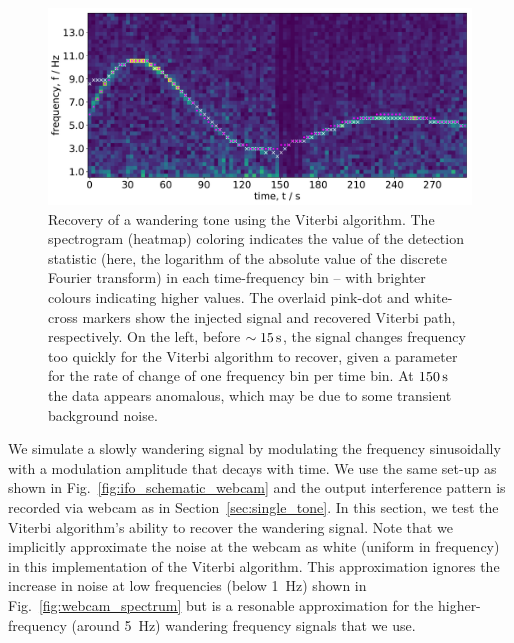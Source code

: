 \documentclass[paper-main.tex]{subfiles}
\begin{document}
\begin{figure}
	\includegraphics[width=\textwidth]{figures/expt_overlay_2_viterbi_test_webcam.pdf}
	\caption{\label{fig:viterbi_overlay}
Recovery of a wandering tone using the Viterbi algorithm.
The spectrogram (heatmap) coloring indicates the value of the detection statistic (here, the logarithm of the absolute value of the discrete Fourier transform) in each time-frequency bin -- with brighter colours indicating higher values. 
The overlaid pink-dot and white-cross markers show the injected signal and recovered Viterbi path, respectively. 
On the left, before $\sim 15\,{\rm s}$, the signal changes frequency too quickly for the Viterbi algorithm to recover, given a parameter for the rate of change of one frequency bin per time bin. 
At $150\,{\rm s}$ the data appears anomalous, which may be due to some transient background noise. }
\end{figure}
 

We simulate a slowly wandering signal by modulating the frequency sinusoidally with a modulation amplitude that decays with time. 
We use the same set-up as shown in Fig.~\ref{fig:ifo_schematic_webcam} and the output interference pattern is recorded via webcam as in Section~\ref{sec:single_tone}. 
In this section, we test the Viterbi algorithm’s ability to recover the wandering signal. 
Note that we implicitly approximate the noise at the webcam as white (uniform in frequency) in this implementation of the Viterbi algorithm. 
This approximation ignores the increase in noise at low frequencies (below 1~Hz) shown in Fig.~\ref{fig:webcam_spectrum} but is a resonable approximation for the higher-frequency (around 5~Hz) wandering frequency signals that we use.
\end{document}
